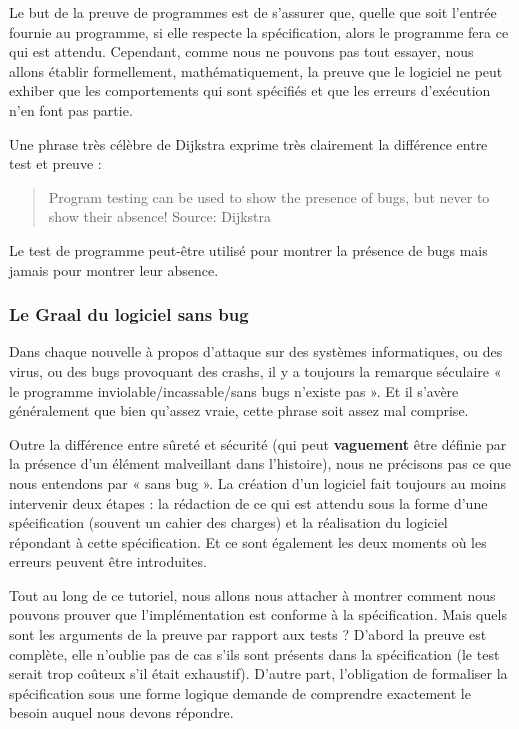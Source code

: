 \documentclass[12pt,francais,]{scrbook}
\begin{document}
Le but de la preuve de programmes est de s'assurer que, quelle que soit
l'entrée fournie au programme, si elle respecte la spécification, alors
le programme fera ce qui est attendu. Cependant, comme nous ne pouvons
pas tout essayer, nous allons établir formellement, mathématiquement, la
preuve que le logiciel ne peut exhiber que les comportements qui sont
spécifiés et que les erreurs d'exécution n'en font pas partie.

Une phrase très célèbre de Dijkstra exprime très clairement la
différence entre test et preuve :

\begin{quote}
Program testing can be used to show the presence of bugs, but never to
show their absence! Source: Dijkstra
\end{quote}

Le test de programme peut-être utilisé pour montrer la présence de bugs
mais jamais pour montrer leur absence.

\subsubsection{Le Graal du logiciel sans
bug}\label{le-graal-du-logiciel-sans-bug}

Dans chaque nouvelle à propos d'attaque sur des systèmes informatiques,
ou des virus, ou des bugs provoquant des crashs, il y a toujours la
remarque séculaire « le programme inviolable/incassable/sans bugs
n'existe pas ». Et il s'avère généralement que bien qu'assez vraie,
cette phrase soit assez mal comprise.

Outre la différence entre sûreté et sécurité (qui peut
\textbf{vaguement} être définie par la présence d'un élément malveillant
dans l'histoire), nous ne précisons pas ce que nous entendons par « sans
bug ». La création d'un logiciel fait toujours au moins intervenir deux
étapes : la rédaction de ce qui est attendu sous la forme d'une
spécification (souvent un cahier des charges) et la réalisation du
logiciel répondant à cette spécification. Et ce sont également les deux
moments où les erreurs peuvent être introduites.

Tout au long de ce tutoriel, nous allons nous attacher à montrer comment
nous pouvons prouver que l'implémentation est conforme à la
spécification. Mais quels sont les arguments de la preuve par rapport
aux tests ? D'abord la preuve est complète, elle n'oublie pas de cas
s'ils sont présents dans la spécification (le test serait trop coûteux
s'il était exhaustif). D'autre part, l'obligation de formaliser la
spécification sous une forme logique demande de comprendre exactement le
besoin auquel nous devons répondre.
\end{document}
